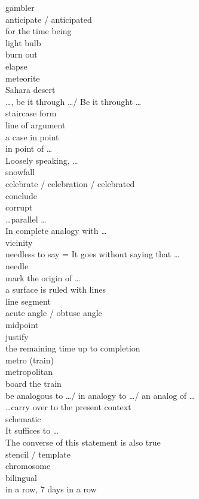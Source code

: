 \documentclass[12pt]{article}
\begin{document}
gambler \\
anticipate / anticipated \\
for the time being \\
light bulb \\
burn out \\
elapse \\
meteorite \\
Sahara desert \\
\dots, be it through \dots / Be it throught \dots \\
staircase form \\
line of argument \\
a case in point \\
in point of \dots \\
Loosely speaking, \dots \\
snowfall \\
celebrate / celebration / celebrated \\
conclude \\
corrupt \\
\dots parallel \dots \\
In complete analogy with \dots \\
vicinity \\
needless to say = It goes without saying that \dots \\
needle \\
mark the origin of \dots \\
a surface is ruled with lines \\
line segment \\
acute angle / obtuse angle \\
midpoint \\
justify \\
the remaining time up to completion \\
metro (train)\\
metropolitan \\
board the train \\
be analogous to \dots / in analogy to \dots / an analog of \dots \\
\dots carry over to the present context \\
schematic \\
It suffices to \dots \\
The converse of this statement is also true \\
stencil / template \\
chromosome \\
bilingual\\
in a row, 7 days in a row \\
\end{document}

